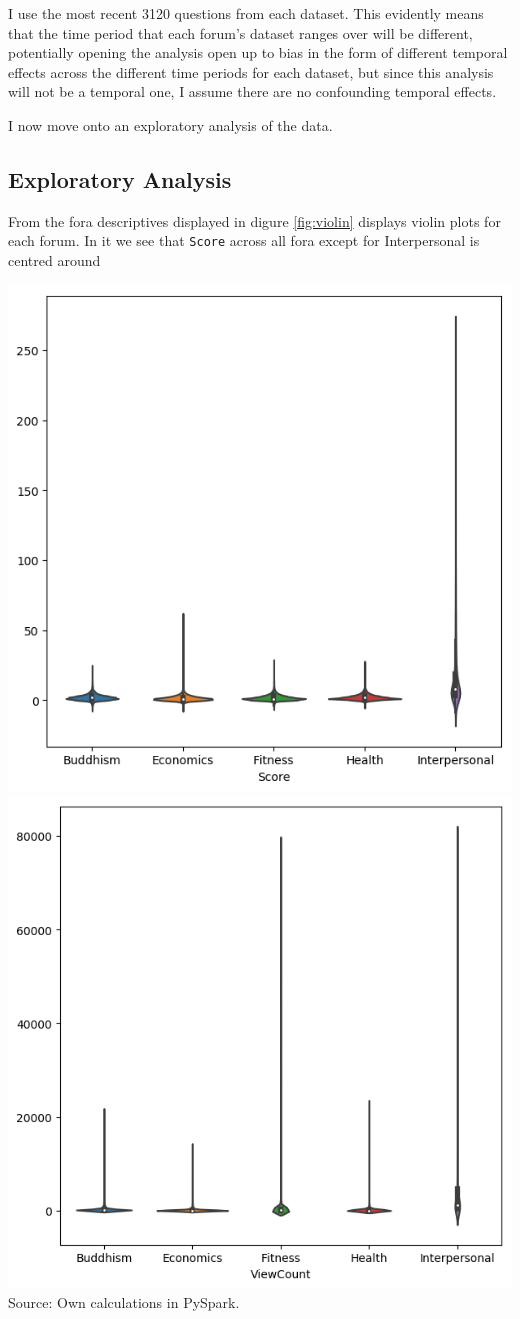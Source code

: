 \documentclass[11pt,preprint, authoryear]{article}
\let\origfigure\figure
\let\endorigfigure\endfigure
\renewenvironment{figure}[1][2] {
    \expandafter\origfigure\expandafter[H]
} {
    \endorigfigure
}
\numberwithin{equation}{section}
\begin{document}

I use the most recent 3120 questions from each dataset. This evidently
means that the time period that each forum's dataset ranges over will be
different, potentially opening the analysis open up to bias in the form
of different temporal effects across the different time periods for each
dataset, but since this analysis will not be a temporal one, I assume
there are no confounding temporal effects.

I now move onto an exploratory analysis of the data.

\subsection{Exploratory Analysis}\label{exploratory-analysis}

From the fora descriptives displayed in digure \ref{fig:violin} displays
violin plots for each forum. In it we see that \texttt{Score} across all
fora except for Interpersonal is centred around

\footnotesize

\begin{figure}
\caption{\textbf{Fora Descriptives}}
\label{fig:desc}
\begin{minipage}{1\textwidth}

\includegraphics[width=0.49\linewidth]{../../01-python-code/00-workspace/01-graphs/score-violin-plot} 
\includegraphics[width=0.49\linewidth]{../../01-python-code/00-workspace/01-graphs/viewcount-violin-plot} 
\\ \centering
{\footnotesize Source: Own calculations in PySpark.}
\end{minipage}
\end{figure}
\end{document}
